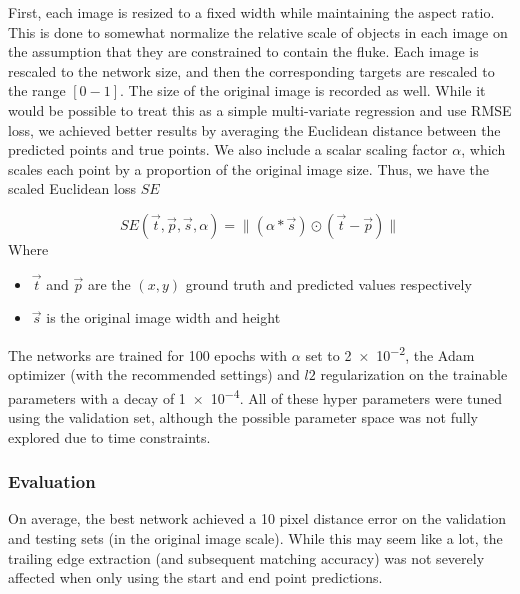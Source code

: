 First, each image is resized to a fixed width while maintaining the aspect ratio.
This is done to somewhat normalize the relative scale of objects in each image on the assumption that they are constrained to contain the fluke.
Each image is rescaled to the network size, and then the corresponding targets are rescaled to the range $[0-1]$.
The size of the original image is recorded as well.
While it would be possible to treat this as a simple multi-variate regression and use RMSE loss, we achieved better results by averaging the Euclidean distance between the predicted points and true points.
We also include a scalar scaling factor $\alpha$, which scales each point by a proportion of the original image size.
Thus, we have the scaled Euclidean loss $SE$

\begin{equation} \label{eqn:se_loss}
SE(\vec{t}, \vec{p}, \vec{s}, \alpha) = \lVert (\alpha * \vec{s}) \odot (\vec{t} - \vec{p}) \rVert
\end{equation}
Where
\begin{itemize}
    \item $\vec{t}$ and $\vec{p}$ are the $(x, y)$ ground truth and predicted values respectively
    \item $\vec{s}$ is the original image width and height
\end{itemize}

The networks are trained for 100 epochs with $\alpha$ set to \num{2e-2}, the Adam \cite{kingma2014adam} optimizer (with the recommended settings) and $l2$ regularization on the trainable parameters with a decay of \num{1e-4}.
All of these hyper parameters were tuned using the validation set, although the possible parameter space was not fully explored due to time constraints.

\subsubsection{Evaluation} %


On average, the best network achieved a 10 pixel distance error on the validation and testing sets (in the original image scale).
While this may seem like a lot, the trailing edge extraction (and subsequent matching accuracy) was not severely affected when only using the start and end point predictions.

